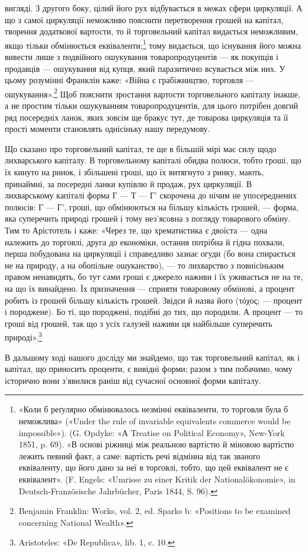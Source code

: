вигляді. З другого боку, цілий його рух відбувається в межах
сфери циркуляції. А що з самої циркуляції неможливо пояснити
перетворення грошей на капітал, творення додаткової вартости,
то й торговельний капітал видається неможливим, якщо тільки
обмінюється еквіваленти;\footnote{
«Коли б реґулярно обмінювалось незмінні еквіваленти, то торговля
була б неможлива» («Under the rule of invariable equivalents commerce
would be impossible»). (G. Opdyke: «А Treatise on Political Economy»,
New-York 1851, p. 69). «В основі ріжниці між реальною вартістю й
міновою вартістю лежить певний факт, а саме: вартість речі відмінна
від так званого еквіваленту, що його дано за неї в торговлі, тобто, що
цей еквівалент не є еквівалент». (F. Engels: «Umrisse zu einer Kritik
der Nationalökonomie», in Deutsch-Französische Jahrbücher, Paris 1844,
S. 96).
} тому видається, що існування його
можна вивести лише з подвійного ошукування товаропродуцентів —
як покупців і продавців — ошукування від купця, який паразитично
всувається між них. У цьому розумінні Франклін каже:
«Війна є грабіжництво, торговля — ошукування».\footnote{
Benjamin Franklin: Works, vol. 2, ed. Sparks b: «Positions to be
examined concerning National Wealth».
} Щоб пояснити
зростання вартости торговельного капіталу інакше, а не
простим тільки ошукуванням товаропродуцентів, для цього потрібен
довгий ряд посередніх ланок, яких зовсім ще бракує тут,
де товарова циркуляція та її прості моменти становлять однісіньку
нашу передумову.

Що сказано про торговельний капітал, те ще в більшій мірі
має силу щодо лихварського капіталу. В торговельному капіталі
обидва полюси, тобто гроші, що їх кинуто на ринок, і збільшені
гроші, що їх витягнуто з ринку, мають, принаймні, за посередні
ланки купівлю й продаж, рух циркуляції. В лихварському капіталі
форма Г — Т — Г' скорочена до нічим не упосереднених полюсів:
Г — Г', гроші, що обмінюються на більшу кількість грошей, —
форма, яка суперечить природі грошей і тому нез’ясовна з погляду
товарового обміну. Тим то Арістотель і каже: «Через те,
що хрематистика є двоїста — одна належить до торговлі, друга до
економіки, остання потрібна й гідна похвали, перша побудована
на циркуляції і справедливо зазнає огуди (бо вона спирається не
на природу, а на обопільне ошуканство), — то лихварство з повнісіньким
правом ненавидять, бо тут сами гроші є джерело наживи
і їх уживається не на те, на що їх винайдено. Їх призначення —
сприяти товаровому обмінові, а процент робить із грошей більшу
кількість грошей. Звідси й назва його (τόχος; — процент і породжене).
Бо ті, що породжені, подібні до тих, що породили. А процент
— то гроші від грошей, так що з усіх галузей наживи ця
найбільше суперечить природі».\footnote{
Aristoteles: «De Republica», lib. 1, c. 10.
}

В дальшому ході нашого досліду ми знайдемо, що так торговельний
капітал, як і капітал, що приносить проценти, є вивідні
форми; разом з тим побачимо, чому історично вони з’явилися
раніш від сучасної основної форми капіталу.